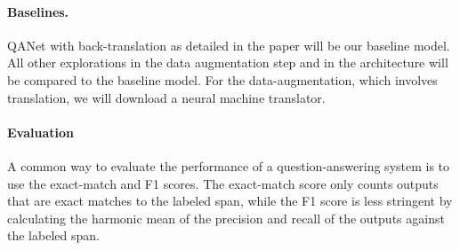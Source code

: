 \documentclass{article}
\begin{document}
\paragraph{Baselines.}
QANet with back-translation as detailed in the paper will be our baseline model. All other explorations in the data augmentation step and in the architecture will be compared to the baseline model. 
For the data-augmentation, which involves translation, we will download a neural machine translator.

\paragraph{Evaluation}
A common way to evaluate the performance of a question-answering system is to use the exact-match and F1 scores. The exact-match score only counts outputs that are exact matches to the labeled span, while the F1 score is less stringent by calculating the harmonic mean of the precision and recall of the outputs against the labeled span.



\end{document}
